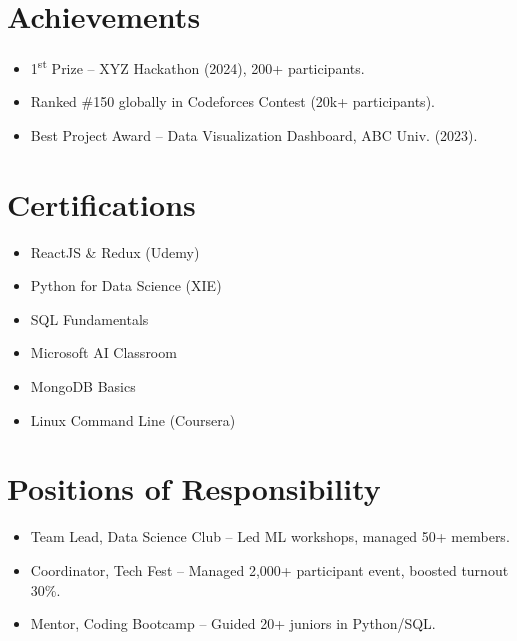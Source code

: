 \documentclass[letterpaper,10.8pt]{article}
\begin{document}
\section{Achievements}
\begin{itemize}[leftmargin=*]
    \item 1\textsuperscript{st} Prize – XYZ Hackathon (2024), 200+ participants.  
    \item Ranked \#150 globally in Codeforces Contest (20k+ participants).  
    \item Best Project Award – Data Visualization Dashboard, ABC Univ. (2023).  
\end{itemize}

\section{Certifications}
\begin{multicols}{2}
\begin{itemize}[leftmargin=*, label={--}]
    \item ReactJS \& Redux (Udemy)  
    \item Python for Data Science (XIE)  
    \item SQL Fundamentals  
    \item Microsoft AI Classroom  
    \item MongoDB Basics  
    \item Linux Command Line (Coursera)  
\end{itemize}
\end{multicols}

\section{Positions of Responsibility}
\begin{itemize}[leftmargin=*]
    \item Team Lead, Data Science Club – Led ML workshops, managed 50+ members.  
    \item Coordinator, Tech Fest – Managed 2,000+ participant event, boosted turnout 30\%.  
    \item Mentor, Coding Bootcamp – Guided 20+ juniors in Python/SQL.  
\end{itemize}
\end{document}
